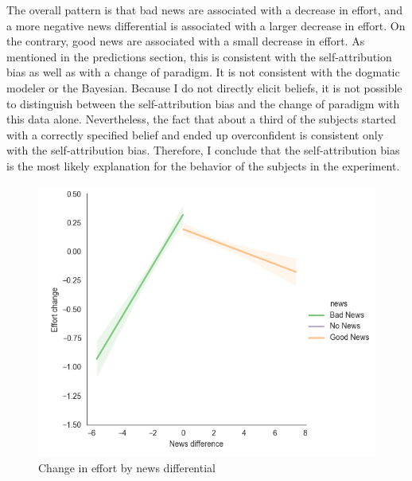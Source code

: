\documentclass[
  12pt,
]{article}
\begin{document}
The overall pattern is that bad news are associated with a decrease in
effort, and a more negative news differential is associated with a
larger decrease in effort. On the contrary, good news are associated
with a small decrease in effort. As mentioned in the predictions
section, this is consistent with the self-attribution bias as well as
with a change of paradigm. It is not consistent with the dogmatic
modeler or the Bayesian. Because I do not directly elicit beliefs, it is
not possible to distinguish between the self-attribution bias and the
change of paradigm with this data alone. Nevertheless, the fact that
about a third of the subjects started with a correctly specified belief
and ended up overconfident is consistent only with the self-attribution
bias. Therefore, I conclude that the self-attribution bias is the most
likely explanation for the behavior of the subjects in the experiment.

\begin{figure}
\hypertarget{fig:reaction-news}{%
\centering
\includegraphics{../figures/effort_change_news.png}
\caption{Change in effort by news differential}\label{fig:reaction-news}
}
\end{figure}
\end{document}
